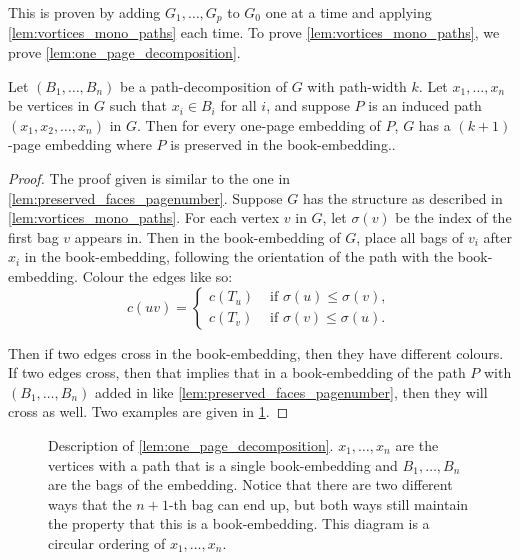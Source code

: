 This is proven by adding $G_1, \ldots, G_p$ to $G_0$ one at a time and applying \cref{lem:vortices_mono_paths} each time. To prove \cref{lem:vortices_mono_paths}, we prove \cref{lem:one_page_decomposition}.
\begin{lemma}\label{lem:one_page_decomposition}
	Let \((B_1, \ldots, B_n)\) be a path-decomposition of \(G\) with path-width \(k\). Let \(x_1, \ldots, x_n\) be vertices in \(G\) such that \(x_i \in B_i\) for all \(i\), and suppose \(P\) is an induced path \((x_1, x_2, \ldots, x_n)\) in \(G\). Then for every one-page embedding of \(P\), \(G\) has a \((k + 1)\)-page embedding where $P$ is preserved in the book-embedding..
\end{lemma}
\begin{proof}
	The proof given is similar to the one in \cref{lem:preserved_faces_pagenumber}. 
	Suppose \(G\) has the structure as described in \cref{lem:vortices_mono_paths}. For each vertex \(v\) in \(G\), let \(\sigma(v)\) be the index of the first bag \(v\) appears in. Then in the book-embedding of \(G\), place all bags of \(v_i\) after \(x_i\) in the book-embedding, following the orientation of the path with the book-embedding. Colour the edges like so:
	\begin{equation}
		c(uv) =
		\begin{cases}
			c(T_u) & \text{ if } \sigma(u) \leq \sigma(v), \\
			c(T_v) & \text{ if } \sigma(v) \leq \sigma(u).
		\end{cases}
	\end{equation}

	Then if two edges cross in the book-embedding, then they have different colours. If two edges cross, then that implies that in a book-embedding of the path \(P\) with \((B_1, \ldots, B_n)\) added in like \cref{lem:preserved_faces_pagenumber}, then they will cross as well. Two examples are given in \cref{fig:preserving_pages}.
\end{proof}

\begin{figure}[h!]
	\centering
	
	\caption[One-page decomposition]{Description of \cref{lem:one_page_decomposition}. \(x_1, \ldots, x_n\) are the vertices with a path that is a single book-embedding and \(B_1, \ldots, B_n\) are the bags of the embedding. Notice that there are two different ways that the \(n + 1\)-th bag can end up, but both ways still maintain the property that this is a book-embedding. This diagram is a circular ordering of \(x_1, \ldots, x_n\).}\label{fig:preserving_pages}
\end{figure}

